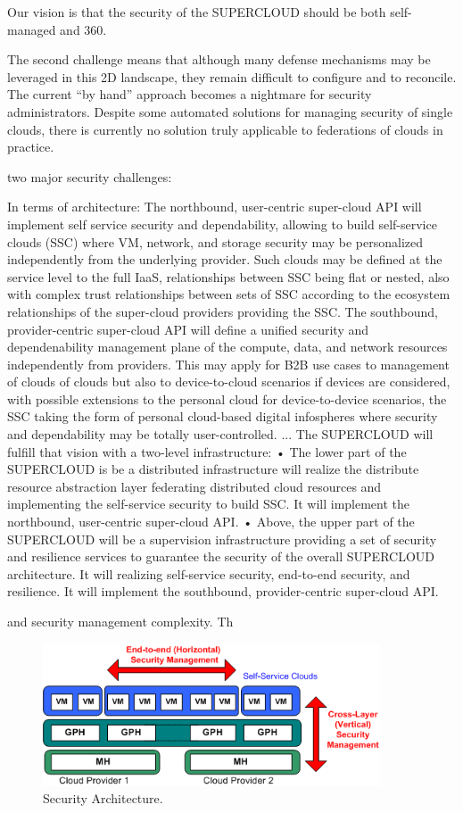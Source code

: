 \documentclass{sig-alternate}
\begin{document}
 Our vision is that the security of the SUPERCLOUD should be both self-managed and 360.

The second challenge means that although many defense mechanisms may be leveraged in this 2D landscape, they remain difficult to configure and to reconcile. The current “by hand” approach becomes a nightmare for security administrators. Despite some automated solutions for managing security of single clouds, there is currently no solution truly applicable to federations of clouds in practice.

two major security challenges: 

In terms of architecture:
The northbound, user-centric super-cloud API will implement self service security and dependability, allowing to build self-service clouds (SSC) where VM, network, and storage security may be personalized independently from the underlying provider. Such clouds may be defined at the service level to the full IaaS, relationships between SSC being flat or nested, also with complex trust relationships between sets of SSC according to the ecosystem relationships of the super-cloud providers providing the SSC. 
The southbound, provider-centric super-cloud API will define a unified security and dependenability management plane of the compute, data, and network resources independently from providers. This may apply for B2B use cases to management of clouds of clouds but also to device-to-cloud scenarios if devices are considered, with possible extensions to the personal cloud for device-to-device scenarios, the SSC taking the form of personal cloud-based digital infospheres where security and dependability may be totally user-controlled.
...
The SUPERCLOUD will fulfill that vision with a two-level infrastructure:
•	The lower part of the SUPERCLOUD is be a distributed infrastructure will realize the distribute resource abstraction layer federating distributed cloud resources and implementing the self-service security to build SSC. It will implement the northbound, user-centric super-cloud API.
•	Above, the upper part of the SUPERCLOUD will be a supervision infrastructure providing a set of security and resilience services to guarantee the security of the overall SUPERCLOUD architecture. It will realizing self-service security, end-to-end security, and resilience. It will implement the southbound, provider-centric super-cloud API.

and security management complexity. Th

\begin{figure}
\begin{center}
\includegraphics[width=10cm]{DCCArchitecture.png}
\end{center}
\caption{Security Architecture.}
\label{fig:archisecu}
\end{figure}
\end{document}
